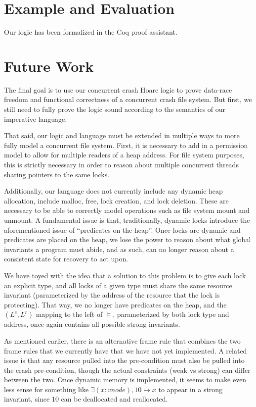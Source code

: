 \section{Example and Evaluation}

Our logic has been formalized in the Coq proof assistant.


\section{Future Work}


The final goal is to use our concurrent crash Hoare logic to prove data-race
freedom and functional correctness of a concurrent crash file system. But first,
we still need to fully prove the logic sound according to the semantics of our
imperative language.

That said, our logic and language must be extended in multiple ways to more
fully model a concurrent file system. First, it is necessary to add in a
permission model to allow for multiple readers of a heap address.  For file
system purposes, this is strictly necessary in order to reason about multiple
concurrent threads sharing pointers to the same locks.

Additionally, our language does not currently include any dynamic heap
allocation, include malloc, free, lock creation, and lock deletion. These are
necessary to be able to correctly model operations such as file system mount and
unmount. A fundamental issue is that, traditionally, dynamic locks introduce the
aforementioned issue of ``predicates on the heap''. Once locks are dynamic and
predicates are placed on the heap, we lose the power to reason about what global
invariants a program must abide, and as such, can no longer reason about a
consistent state for recovery to act upon.

We have toyed with the idea that a solution to this problem is to give each lock
an explicit type, and all locks of a given type must share the same resource
invariant (parameterized by the address of the resource that the lock is
protecting). That way, we no longer have predicates on the heap, and the
$(L^c,L^r)$ mapping to the left of $\vDash$, parameterized by both lock type and
address, once again contains all possible strong invariants.

As mentioned earlier, there is an alternative frame rule that combines the two
frame rules that we currently have that we have not yet implemented. A related
issue is that any resource pulled into the pre-condition must also be pulled
into the crash pre-condition, though the actual constraints (weak vs strong)
can differ between the two. Once dynamic memory is implemented, it seems to make
even less sense for something like $\exists (x:vnode), 10\mapsto x$ to appear in
a strong invariant, since $10$ can be deallocated and reallocated.

